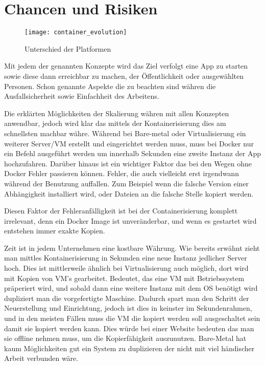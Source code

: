 \newpage
\section{Chancen und Risiken}

\begin{figure}[H]
\caption{Unterschied der Platformen}
\texttt{[image: container\_evolution]}
\\
\cite[][27.03.2020]{Quelle: https://bit.ly/32EnzVe}
\end{figure}

Mit jedem der genannten Konzepte wird das Ziel verfolgt eine App zu starten sowie diese dann erreichbar zu machen, der Öffentlichkeit oder ausgewählten Personen.
Schon genannte Aspekte die zu beachten sind währen die Ausfallsicherheit sowie Einfachheit des Arbeitens.

Die erklärten Möglichkeiten der Skalierung währen mit allen Konzepten anwendbar, jedoch wird klar das mittels der Kontainerisierung dies am schnellsten machbar währe.
Während bei Bare-metal oder Virtualisierung ein weiterer Server/VM erstellt und eingerichtet werden muss, muss bei Docker nur ein Befehl ausgeführt werden um innerhalb Sekunden eine zweite 
Instanz der App hochzufahren.
Darüber hinaus ist ein wichtiger Faktor das bei den Wegen ohne Docker Fehler passieren können. Fehler, die auch vielleicht erst irgendwann während der Benutzung auffallen.
Zum Beispiel wenn die falsche Version einer Abhängigkeit installiert wird, oder Dateien an die falsche Stelle kopiert werden.

Diesen Faktor der Fehleranfälligkeit ist bei der Containerisierung komplett irrelevant, denn ein Docker Image ist unveränderbar, und wenn es gestartet wird 
entstehen immer exakte Kopien.

Zeit ist in jedem Unternehmen eine kostbare Währung. Wie bereits erwähnt zieht man mittles Kontainerisierung in Sekunden eine neue Instanz jedlicher Server hoch.
Dies ist mittlerweile ähnlich bei Virtualisierung auch möglich, dort wird mit Kopien von VM's gearbeitet. Bedeutet, das eine VM mit Betriebssystem präperiert wird, und
sobald dann eine weitere Instanz mit dem OS benötigt wird dupliziert man die vorgefertigte Maschine. Dadurch spart man den Schritt der Neuerstellung und Einrichtung, jedoch
ist dies in keinster im Sekundenrahmen, und in den meisten Fällen muss die VM die kopiert werden soll ausgeschaltet sein damit sie kopiert werden kann. 
Dies würde bei einer Website bedeuten das man sie offline nehmen muss, um die Kopierfähigkeit auszunutzen.
Bare-Metal hat kaum Möglichkeiten gut ein System zu duplizieren der nicht mit viel händischer Arbeit verbunden wäre.

